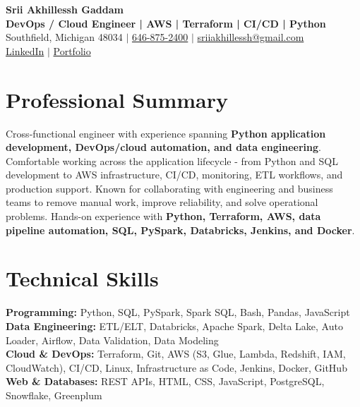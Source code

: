 \documentclass[letterpaper,10pt]{article}
\begin{document}
\fontsize{9.35pt}{10.45pt}\selectfont

\begin{center}
    {\LARGE \textbf{Srii Akhillessh Gaddam}} \\[-1pt]
    \textbf{DevOps / Cloud Engineer | AWS | Terraform | CI/CD | Python} \\[2pt]
    Southfield, Michigan 48034 $|$
    \href{tel:6468752400}{646-875-2400} $|$
    \href{mailto:sriiakhillessh@gmail.com}{sriiakhillessh@gmail.com} \\[1pt]
    \href{https://www.linkedin.com/in/srii-akhiilessh-gaddam-b48668191/}{LinkedIn} $|$
    \href{https://sriiakhillesshg.github.io/portfolio/}{Portfolio}
\end{center}
\vspace{-8pt}

\section{Professional Summary}
\small{Cross-functional engineer with experience spanning \textbf{Python application development, DevOps/cloud automation, and data engineering}. Comfortable working across the application lifecycle - from Python and SQL development to AWS infrastructure, CI/CD, monitoring, ETL workflows, and production support. Known for collaborating with engineering and business teams to remove manual work, improve reliability, and solve operational problems. Hands-on experience with \textbf{Python, Terraform, AWS, data pipeline automation, SQL, PySpark, Databricks, Jenkins, and Docker}.}

\section{Technical Skills}
\small{
\textbf{Programming:} Python, SQL, PySpark, Spark SQL, Bash, Pandas, JavaScript \\
\textbf{Data Engineering:} ETL/ELT, Databricks, Apache Spark, Delta Lake, Auto Loader, Airflow, Data Validation, Data Modeling \\
\textbf{Cloud \& DevOps:} Terraform, Git, AWS (S3, Glue, Lambda, Redshift, IAM, CloudWatch), CI/CD, Linux, Infrastructure as Code, Jenkins, Docker, GitHub \\
\textbf{Web \& Databases:} REST APIs, HTML, CSS, JavaScript, PostgreSQL, Snowflake, Greenplum
}
\end{document}
